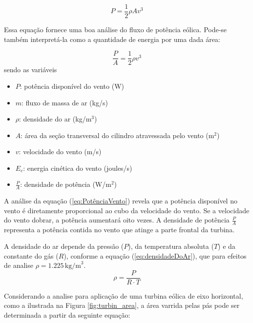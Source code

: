         \begin{equation}
            P = \frac{1}{2} \rho A v^3 
            \label{eq:PotênciaVento}
        \end{equation}
        
        \par Essa equação fornece uma boa análise do fluxo de potência eólica. Pode-se também interpretá-la como a quantidade de energia por uma dada área:
        
        \begin{equation}
            \frac{P}{A} = \frac{1}{2} \rho v^3 
            \label{eq:DensidadeDePotência}
        \end{equation}
        sendo as variáveis
        \begin{itemize}
            \item $P$: potência disponível do vento (W)
            \item $m$: fluxo de massa de ar (kg/s)
            \item $\rho$: densidade do ar (kg/m\(^3\))
            \item $A$: área da seção transversal do cilindro atravessada pelo vento (m\(^2\))
            \item $v$: velocidade do vento (m/s)
            \item $E_c$: energia cinética do vento (joules/s)
            \item $\frac{P}{A}$: densidade de potência (W/m\(^2\))
        \end{itemize}
        
        \par A análise da equação (\ref{eq:PotênciaVento}) revela que a potência disponível no vento é diretamente proporcional ao cubo da velocidade do vento. Se a velocidade do vento dobrar, a potência aumentará oito vezes. A densidade de potência $\frac{P}{A}$ representa a potência contida no vento que atinge a parte frontal da turbina. 
        \par A densidade do ar depende da pressão ($P$), da temperatura absoluta ($T$) e da constante do gás ($R$), conforme a equação (\ref{eq:densidadeDoAr}), que para efeitos de analise $\rho = 1.225 \, \text{kg/m}^3$.
        \begin{equation}
            \rho = \frac{P}{R \cdot T}
            \label{eq:densidadeDoAr}
        \end{equation}

        \par Considerando a analise para aplicação de uma turbina eólica de eixo horizontal, como a ilustrada na Figura \ref{fig:turbin_area}, a área varrida pelas pás pode ser determinada a partir da seguinte equação:

